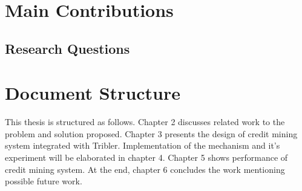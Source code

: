 %



\section{Main Contributions}

\subsection{Research Questions}

\section{Document Structure}
This thesis is structured as follows. Chapter 2 discusses related work to the problem and solution proposed. Chapter 3 presents the design of credit mining system integrated with Tribler. Implementation of the mechanism and it's experiment will be elaborated in chapter 4. Chapter 5 shows performance of credit mining system. At the end, chapter 6 concludes the work mentioning possible future work.
